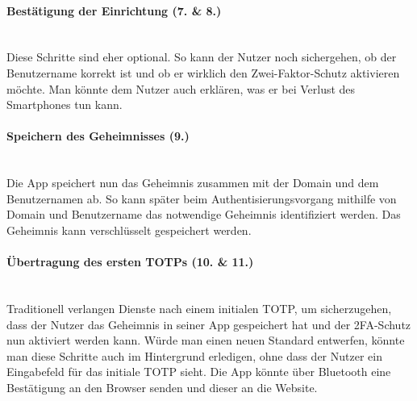 \paragraph*{Bestätigung der Einrichtung (7. \& 8.)}
\mbox{} \vspace{0.1cm} \\
Diese Schritte sind eher optional. So kann der Nutzer noch sichergehen, ob der 
Benutzername korrekt ist und ob er wirklich den Zwei-Faktor-Schutz aktivieren 
möchte. Man könnte dem Nutzer auch erklären, was er bei Verlust des Smartphones 
tun kann.

\paragraph*{Speichern des Geheimnisses (9.)}
\mbox{} \vspace{0.1cm} \\
Die App speichert nun das Geheimnis zusammen mit der Domain und dem Benutzernamen ab. So kann später beim Authentisierungsvorgang mithilfe von Domain und 
Benutzername das notwendige Geheimnis identifiziert werden. Das Geheimnis kann 
verschlüsselt gespeichert werden.

\paragraph*{Übertragung des ersten TOTPs (10. \& 11.)}
\mbox{} \vspace{0.1cm} \\
Traditionell verlangen Dienste nach einem initialen TOTP, um sicherzugehen, dass 
der Nutzer das Geheimnis in seiner App gespeichert hat und der 2FA-Schutz nun 
aktiviert werden kann. Würde man einen neuen Standard entwerfen, könnte man diese 
Schritte auch im Hintergrund erledigen, ohne dass der Nutzer ein Eingabefeld für 
das initiale TOTP sieht. Die App könnte über Bluetooth eine Bestätigung an den 
Browser senden und dieser an die Website.
